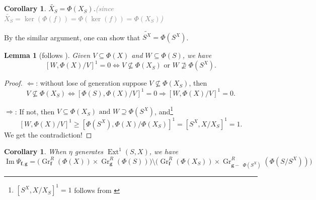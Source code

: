 \documentclass[reqno,11pt]{amsart}
\numberwithin{equation}{section}
\theoremstyle{plain}
\newtheorem{lemma}[theorem]{Lemma}
\newtheorem{corollary}[theorem]{Corollary}
\theoremstyle{plain}
\numberwithin{equation}{section}
\theoremstyle{remark}
\DeclareMathOperator{\Img}{\operatorname{Im}}
\DeclareMathOperator{\Ext}{\operatorname{Ext}}
\DeclareMathOperator{\dimv}{\operatorname{\underline{\mathbf{dim}}}}
\newcommand{\Grr}{\operatorname{Gr}^{R}}
\newcommand{\dimvec}[1]{\mathbf{#1}}
\begin{document}
\begin{corollary}
	$\widetilde{X_S}=\Phi(X_S)$.\textcolor{gray}{(since $\widetilde{X_S}=\ker (\Phi(f))=\Phi(\ker(f))=\Phi(X_S)$)}
\end{corollary}
By the similar argument, one can show that $\widetilde{S^X}=\Phi(S^X)$.
\begin{lemma}[follows {\cite[Lemma 31(6)]{irelli2019cell}}]
Given $V \subseteq \Phi(X)$ and $W \subseteq \Phi(S)$, we have 
$$[W,\Phi(X)/V]^1=0 \iff V \nsubseteq \Phi(X_S) \text{ or }W \nsupseteq \Phi(S^X).$$
\end{lemma}
\begin{proof}
$\Leftarrow$: without lose of generation suppose $V \nsubseteq \Phi(X_S)$, then
$$V \nsubseteq \Phi(X_S) \iff [\Phi(S),\Phi(X)/V ]^1=0 \Rightarrow  [W,\Phi(X)/V ]^1=0.$$

\hspace{0.8cm}$\Rightarrow$: If not, then $V \subseteq \Phi(X_S) \text{ and }W \supseteq \Phi(S^X)$, and\footnote{$[S^X,X/X_S]^1=1$ follows from \cite[Lemma 31(5)]{irelli2019cell}} 
$$[W,\Phi(X)/V]^1 \geqslant [\Phi(S^X),\Phi(X)/\Phi(X_S)]^1 =[S^X,X/X_S]^1=1.$$
We get the contradiction!
\end{proof}
\begin{corollary}\label{cor:img2}
When $\eta$ generates $\Ext^1(S,X)$, we have 
	$$\Img \Psi_{\dimvec{f},\dimvec{g}} = \bigg(\Grr_{\dimvec{f}}(\Phi(X)) \times \Grr_{\dimvec{g}}(\Phi(S)) \bigg) \setminus \bigg(\Grr_{\dimvec{f}}(\Phi(X_S)) \times \Grr_{\dimvec{g}-\dimv \Phi(S^X)}\left(\Phi(S/S^X)\right) \bigg)$$
\end{corollary}
\end{document}
